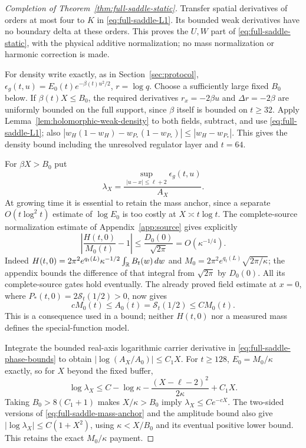 \begin{proof}[Completion of Theorem~\ref{thm:full-saddle-static}]
Transfer spatial derivatives of orders at most four to $K$ in
\eqref{eq:full-saddle-L1}. Its bounded weak derivatives have no boundary
delta at these orders. This proves the $U,W$ part of
\eqref{eq:full-saddle-static}, with the physical additive normalization;
no mass normalization or harmonic correction is made.

For density write exactly, as in Section~\ref{sec:protocol},
$\epsilon_g(t,u)=E_0(t)e^{-\beta(t)u^2/2}$, $r=\log q$.
Choose a sufficiently large fixed $B_0$ below.
If $\beta(t)X\le B_0$, the required derivatives
$r_x=-2\beta u$ and $\Delta r=-2\beta$ are uniformly bounded on the
full support, since $\beta$ itself is bounded on $t\ge32$.
Apply Lemma~\ref{lem:holomorphic-weak-density} to both fields, subtract,
and use \eqref{eq:full-saddle-L1}; also
$|w_H(1-w_H)-w_{P_*}(1-w_{P_*})|\le|w_H-w_{P_*}|$.
This gives the density bound including the unresolved regulator layer
and $t=64$.

For $\beta X>B_0$ put
\begin{equation}
 \lambda_X=
 \frac{\sup_{|u-x|\le\ell+2}\epsilon_g(t,u)}{A_X}.
 \label{eq:full-saddle-regulator-ratio}
\end{equation}
At growing time it is essential to retain the mass anchor, since a
separate $O(t\log^2t)$ estimate of $\log E_0$ is too costly at
$X\asymp t\log t$.
The complete-source normalization estimate of Appendix~\ref{app:source}
gives explicitly
\begin{equation}
 \left|\frac{H(t,0)}{M_0(t)}-1\right|
 \le\frac{D_0(0)}{\sqrt{2\pi}}=O(\kappa^{-1/4}).
 \label{eq:full-saddle-source-anchor}
\end{equation}
Indeed $H(t,0)=2\pi^2e^{q_t(L)}\kappa^{-1/2}\int_\mathbb R B_t(w)\,dw$
and $M_0=2\pi^2e^{q_t(L)}\sqrt{2\pi/\kappa}$; the appendix bounds
the difference of that integral from $\sqrt{2\pi}$ by $D_0(0)$.
All its complete-source gates hold eventually. The already proved field
estimate at $x=0$, where $P_*(t,0)=2\mathcal S_t(1/2)>0$, now gives
\begin{equation}
 cM_0(t)\le A_0(t)=\mathcal S_t(1/2)\le CM_0(t).
 \label{eq:full-saddle-mass-anchor}
\end{equation}
This is a consequence used in a bound; neither $H(t,0)$ nor a measured
mass defines the special-function model.

Integrate the bounded real-axis logarithmic carrier derivative in
\eqref{eq:full-saddle-phase-bounds} to obtain
$|\log(A_X/A_0)|\le C_1X$.
For $t\ge128$, $E_0=M_0/\kappa$ exactly, so for $X$ beyond the fixed
buffer,
\begin{equation}
 \log\lambda_X\le C-\log\kappa
       -\frac{(X-\ell-2)^2}{2\kappa}+C_1X.
 \label{eq:full-saddle-regulator-payment}
\end{equation}
Taking $B_0>8(C_1+1)$ makes $X/\kappa>B_0$ imply
$\lambda_X\le Ce^{-cX}$. The two-sided versions of
\eqref{eq:full-saddle-mass-anchor} and the amplitude bound also give
$|\log\lambda_X|\le C(1+X^2)$, using $\kappa<X/B_0$ and its eventual
positive lower bound. This retains the exact $M_0/\kappa$ payment.


\end{proof}
